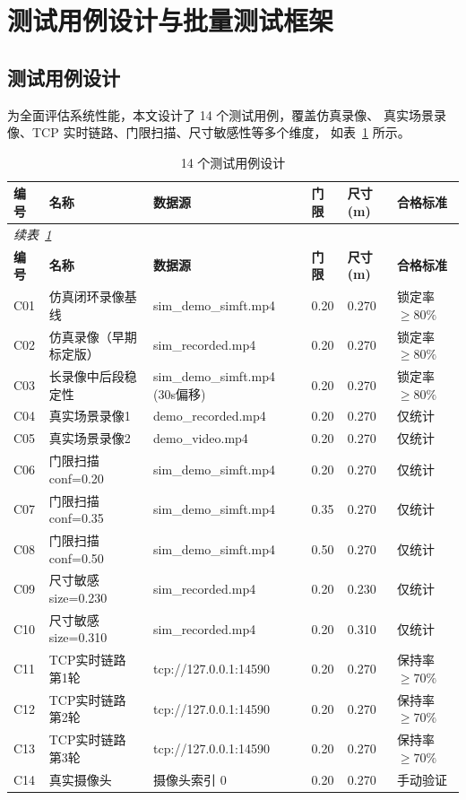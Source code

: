 \documentclass[12pt, a4paper]{ctexart}
\begin{document}
\section{测试用例设计与批量测试框架}
\label{sec:testcases}

\subsection{测试用例设计}

为全面评估系统性能，本文设计了 14 个测试用例，覆盖仿真录像、
真实场景录像、TCP 实时链路、门限扫描、尺寸敏感性等多个维度，
如表~\ref{tab:cases} 所示。

\begin{longtable}{p{1cm}p{3.5cm}p{2.5cm}p{1.2cm}p{1.2cm}p{1.5cm}}
\caption{14 个测试用例设计} \label{tab:cases} \\
\toprule
\textbf{编号} & \textbf{名称} & \textbf{数据源} & \textbf{门限} & \textbf{尺寸(m)} & \textbf{合格标准} \\
\midrule
\endfirsthead
\multicolumn{6}{l}{\small\itshape 续表~\ref{tab:cases}} \\
\toprule
\textbf{编号} & \textbf{名称} & \textbf{数据源} & \textbf{门限} & \textbf{尺寸(m)} & \textbf{合格标准} \\
\midrule
\endhead
\bottomrule
\endfoot
C01 & 仿真闭环录像基线 & sim\_demo\_simft.mp4 & 0.20 & 0.270 & 锁定率$\geq 80\%$ \\
C02 & 仿真录像（早期标定版） & sim\_recorded.mp4 & 0.20 & 0.270 & 锁定率$\geq 80\%$ \\
C03 & 长录像中后段稳定性 & sim\_demo\_simft.mp4 (30s偏移) & 0.20 & 0.270 & 锁定率$\geq 80\%$ \\
C04 & 真实场景录像1 & demo\_recorded.mp4 & 0.20 & 0.270 & 仅统计 \\
C05 & 真实场景录像2 & demo\_video.mp4 & 0.20 & 0.270 & 仅统计 \\
C06 & 门限扫描 conf=0.20 & sim\_demo\_simft.mp4 & 0.20 & 0.270 & 仅统计 \\
C07 & 门限扫描 conf=0.35 & sim\_demo\_simft.mp4 & 0.35 & 0.270 & 仅统计 \\
C08 & 门限扫描 conf=0.50 & sim\_demo\_simft.mp4 & 0.50 & 0.270 & 仅统计 \\
C09 & 尺寸敏感 size=0.230 & sim\_recorded.mp4 & 0.20 & 0.230 & 仅统计 \\
C10 & 尺寸敏感 size=0.310 & sim\_recorded.mp4 & 0.20 & 0.310 & 仅统计 \\
C11 & TCP实时链路 第1轮 & tcp://127.0.0.1:14590 & 0.20 & 0.270 & 保持率$\geq 70\%$ \\
C12 & TCP实时链路 第2轮 & tcp://127.0.0.1:14590 & 0.20 & 0.270 & 保持率$\geq 70\%$ \\
C13 & TCP实时链路 第3轮 & tcp://127.0.0.1:14590 & 0.20 & 0.270 & 保持率$\geq 70\%$ \\
C14 & 真实摄像头 & 摄像头索引 0 & 0.20 & 0.270 & 手动验证 \\
\end{longtable}
\end{document}
